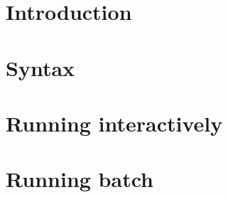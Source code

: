 \documentclass[a4paper,10pt]{report}
\begin{document}




\tableofcontents

\chapter{Introduction}
\label{Introduction}


%

\chapter{Syntax}
\label{Syntax}


\chapter{Running \nusmvhead interactively}
\label{Running NuSMV interactively}


\chapter{Running \nusmvhead batch}
\label{Running NuSMV batch} 






\newpage
\appendix


\cleardoublepage

\printindex[com]
\printindex[var]
\printindex
\end{document}
